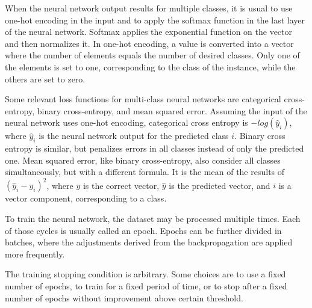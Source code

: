 {\color{red}
When the neural network output results for multiple classes, it is usual to use one-hot encoding in the input and to apply the softmax function in the last layer of the neural network.
Softmax applies the exponential function on the vector and then normalizes it.
In one-hot encoding, a value is converted into a vector where the number of elements equals the number of desired classes. Only one of the elements is set to one, corresponding to the class of the instance, while the others are set to zero.

Some relevant loss functions for multi-class neural networks are categorical cross-entropy, binary cross-entropy, and mean squared error. 
Assuming the input of the neural network uses one-hot encoding, categorical cross entropy is $-log(\hat{y}_i)$, where $\hat{y}_i$ is the neural network output for the predicted class $i$. Binary cross entropy is similar, but penalizes errors in all classes instead of only the predicted one. Mean squared error, like binary cross-entropy, also consider all classes simultaneously, but with a different formula. It is the mean of the results of $(\hat{y}_i - y_i)^2$, where $y$ is the correct vector, $\hat{y}$ is the predicted vector, and $i$ is a vector component, corresponding to a class.

To train the neural network, the dataset may be processed multiple times. Each of those cycles is usually called an epoch. Epochs can be further divided in batches, where the adjustments derived from the backpropagation are applied more frequently.

The training stopping condition is arbitrary. Some choices are to use a fixed number of epochs, to train for a fixed period of time, or to stop after a fixed number of epochs without improvement above certain threshold.
}
